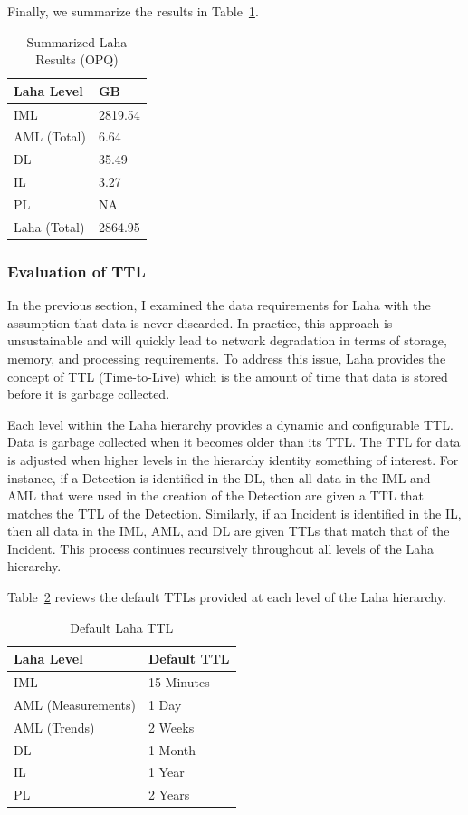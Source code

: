 Finally, we summarize the results in Table~\ref{table:summarized_laha_results_lokahi}.

\begin{table}[H]
	\centering
	\caption{Summarized Laha Results (OPQ)}
	\begin{tabularx}{\textwidth}{ll}
		\toprule
		\textbf{Laha Level} & \bm{$\mu Size$} \textbf{GB} \\
		\midrule
		IML & 2819.54 \\
		AML (Total) & 6.64  \\
		DL & 35.49  \\
		IL & 3.27  \\
		PL & NA  \\
		Laha (Total) & 2864.95  \\
		\bottomrule
	\end{tabularx}
	\label{table:summarized_laha_results_lokahi}
\end{table}

\subsubsection{Evaluation of TTL}
In the previous section, I examined the data requirements for Laha with the assumption that data is never discarded. In practice, this approach is unsustainable and will quickly lead to network degradation in terms of storage, memory, and processing requirements. To address this issue, Laha provides the concept of TTL (Time-to-Live) which is the amount of time that data is stored before it is garbage collected.

Each level within the Laha hierarchy provides a dynamic and configurable TTL. Data is garbage collected when it becomes older than its TTL. The TTL for data is adjusted when higher levels in the hierarchy identity something of interest. For instance, if a Detection is identified in the DL, then all data in the IML and AML that were used in the creation of the Detection are given a TTL that matches the TTL of the Detection. Similarly, if an Incident is identified in the IL, then all data in the IML, AML, and DL are given TTLs that match that of the Incident. This process continues recursively throughout all levels of the Laha hierarchy.

Table~\ref{table:ttl_summary} reviews the default TTLs provided at each level of the Laha hierarchy.

\begin{table}[H]
	\centering
	\caption{Default Laha TTL}
	\begin{tabularx}{\textwidth}{ll}
		\toprule
		\textbf{Laha Level} & \textbf{Default TTL} \\
		\midrule
		IML & 15 Minutes \\
		AML (Measurements) & 1 Day \\
		AML (Trends) & 2 Weeks \\
		DL & 1 Month \\
		IL & 1 Year \\
		PL & 2 Years \\
		\bottomrule
	\end{tabularx}
	\label{table:ttl_summary}
\end{table}

